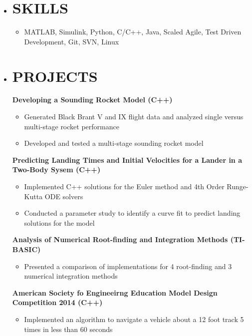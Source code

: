 \documentclass[overlapped, 11pt]{res}
\begin{document}
\begin{resume}
\begin{itemize}
    \item[]\section{SKILLS}
        \begin{itemize}
        \item[]MATLAB, Simulink, Python, C/C++, Java, Scaled Agile, 
        Test Driven Development, Git, SVN, Linux
        \end{itemize}
    \item[]\section{PROJECTS}

        \textbf{Developing a Sounding Rocket Model (C++)}
            \begin{itemize}
                \item Generated Black Brant V and IX flight data and analyzed 
                single versus multi-stage rocket performance
                \item Developed and tested a multi-stage sounding rocket model
            \end{itemize}

        \vspace{0.5em}
        \textbf{Predicting Landing Times and Initial Velocities for a Lander in
        a Two-Body Sysem (C++)}
            \begin{itemize}
                \item Implemented C++ solutions for the Euler method and 4th 
                Order Runge-Kutta ODE solvers
                \item Conducted a parameter study to identify a curve fit to 
                predict landing solutions for the model
            \end{itemize}

        \vspace{0.5em}
        \textbf{Analysis of Numerical Root-finding and Integration Methods (TI-BASIC)}
            \begin{itemize}
                \item Presented a comparison of implementations for 4
                root-finding and 3 numerical integration methods
            \end{itemize}

        \vspace{0.5em}
        \textbf{American Society fo Engineeirng Education Model Design 
        Competition 2014 (C++)}
            \begin{itemize}
                \item Implemented an algorithm to navigate a vehicle about a
                12 foot track 5 times in less than 60 seconds
            \end{itemize}


\end{itemize}
\end{resume}
\end{document}
